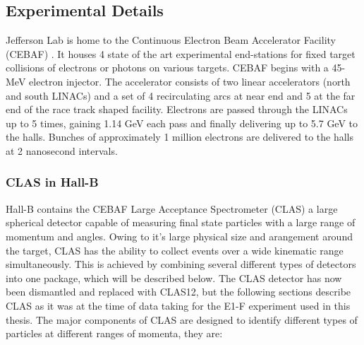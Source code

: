 \subsection{Experimental Details}
Jefferson Lab is home to the Continuous Electron Beam Accelerator Facility (CEBAF) \cite{hardware-leemann:2001}.  It houses 4 state of the art experimental end-stations for fixed target collisions of electrons or photons on various targets.  CEBAF begins with a 45-MeV electron injector.  The accelerator consists of two linear accelerators (north and south LINACs) and a set of 4 recirculating arcs at near end and 5 at the far end of the race track shaped facility.  Electrons are passed through the LINACs up to 5 times, gaining 1.14 GeV each pass and finally delivering up to 5.7 GeV to the halls.  Bunches of approximately 1 million electrons are delivered to the halls at 2 nanosecond intervals.

\subsubsection{CLAS in Hall-B}
Hall-B contains the CEBAF Large Acceptance Spectrometer (CLAS) a large spherical detector capable of measuring final state particles with a large range of momentum and angles.  Owing to it's large physical size and arangement around the target, CLAS has the ability to collect events over a wide kinematic range simultaneously.  This is achieved by combining several different types of detectors into one package, which will be described below.  The CLAS detector has now been dismantled and replaced with CLAS12, but the following sections describe CLAS as it was at the time of data taking for the E1-F experiment used in this thesis.  The major components of CLAS \cite{hardware-mecking:2003} are designed to identify different types of particles at different ranges of momenta, they are:

